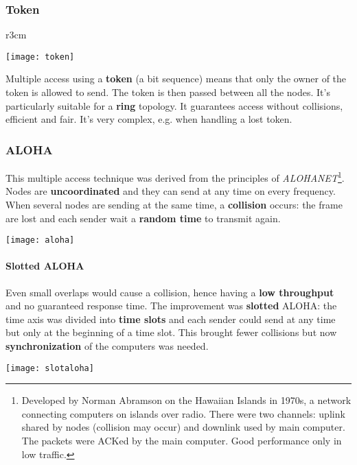 \subsubsection{Token}
\begin{wrapfigure}[5]{r}{3cm}
	\vspace{-1.5cm}
	\begin{center}
		\texttt{[image: token]}
	\end{center}
\end{wrapfigure}
Multiple access using a \textbf{token} (a bit sequence) means that only the owner of the token is allowed to send. The token is then passed between all the nodes. It's particularly suitable for a \textbf{ring} topology. It guarantees access without collisions, efficient and fair. It's very complex, e.g. when handling a lost token.

\subsubsection{ALOHA}
This multiple access technique was derived from the principles of \textit{ALOHANET}\footnote{Developed by Norman Abramson on the Hawaiian Islands in 1970s, a network connecting computers on islands over radio. There were two channels: uplink shared by nodes (collision may occur) and downlink used by main computer. The packets were ACKed by the main computer. Good performance only in low traffic.}. Nodes are \textbf{uncoordinated} and they can send at any time on every frequency. When several nodes are sending at the same time, a \textbf{collision} occurs: the frame are lost and each sender wait a \textbf{random time} to transmit again.

\begin{center}
	\texttt{[image: aloha]}
\end{center}

\paragraph{Slotted ALOHA} Even small overlaps would cause a collision, hence having a \textbf{low throughput} and no guaranteed response time. The improvement was \textbf{slotted} ALOHA: the time axis was divided into \textbf{time slots} and each sender could send at any time but only at the beginning of a time slot. This brought fewer collisions but now \textbf{synchronization} of the computers was needed.

\begin{center}
	\texttt{[image: slotaloha]}
\end{center}

